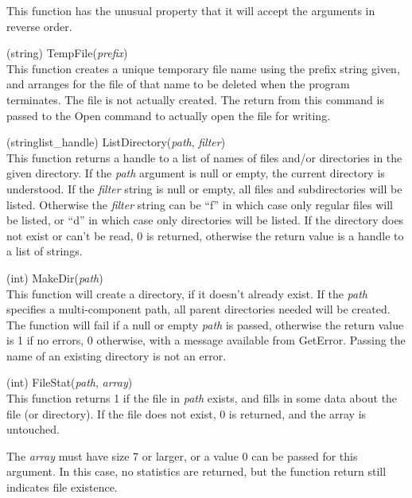 \begin{description}
This function has the unusual property that it will accept the
arguments in reverse order.

\item{(string) \vt TempFile({\it prefix\/})}\\
This function creates a unique temporary file name using the prefix
string given, and arranges for the file of that name to be deleted
when the program terminates.  The file is not actually created.  The
return from this command is passed to the {\vt Open} command to
actually open the file for writing.

\item{(stringlist\_handle) \vt ListDirectory({\it path},
  {\it filter\/})}\\
This function returns a handle to a list of names of files and/or
directories in the given directory.  If the {\it path} argument
is null or empty, the current directory is understood.  If the {\it
filter} string is null or empty, all files and subdirectories will be
listed.  Otherwise the {\it filter} string can be ``{\vt f}'' in which
case only regular files will be listed, or ``{\vt d}'' in which case
only directories will be listed.  If the directory does not exist or
can't be read, 0 is returned, otherwise the return value is a handle
to a list of strings.

\item{(int) \vt MakeDir({\it path})}\\
This function will create a directory, if it doesn't already exist. 
If the {\it path} specifies a multi-component path, all parent
directories needed will be created.  The function will fail if a null
or empty {\it path} is passed, otherwise the return value is 1 if no
errors, 0 otherwise, with a message available from {\vt GetError}. 
Passing the name of an existing directory is not an error.

\item{(int) \vt FileStat({\it path}, {\it array\/})}\\
This function returns 1 if the file in {\it path} exists, and fills in
some data about the file (or directory).  If the file does not exist,
0 is returned, and the array is untouched.

The {\it array} must have size 7 or larger, or a value 0 can be passed
for this argument.  In this case, no statistics are returned, but the
function return still indicates file existence.


\end{description}
